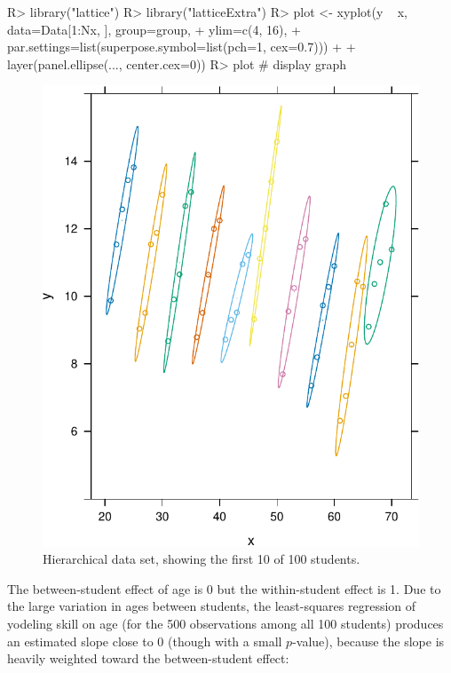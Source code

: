 \documentclass[
]{jss}
\begin{document}
\begin{CodeChunk}
\begin{CodeInput}
R> library("lattice")
R> library("latticeExtra")
R> plot <- xyplot(y ~ x, data=Data[1:Nx, ], group=group,
+                ylim=c(4, 16),
+                par.settings=list(superpose.symbol=list(pch=1, cex=0.7))) +
+     layer(panel.ellipse(..., center.cex=0))
R> plot # display graph
\end{CodeInput}
\begin{figure}

{\centering \includegraphics[width=1\linewidth]{JSS-article-reduced_files/figure-latex/plot1-1} 

}

\caption[Hierarchical data set, showing the first 10 of 100 students]{Hierarchical data set, showing the first 10 of 100 students.}\label{fig:plot1}
\end{figure}
\end{CodeChunk}

The between-student effect of age is 0 but the within-student effect is
1. Due to the large variation in ages between students, the
least-squares regression of yodeling skill on age (for the 500
observations among all 100 students) produces an estimated slope close
to 0 (though with a small \(p\)-value), because the slope is heavily
weighted toward the between-student effect:
\end{document}
